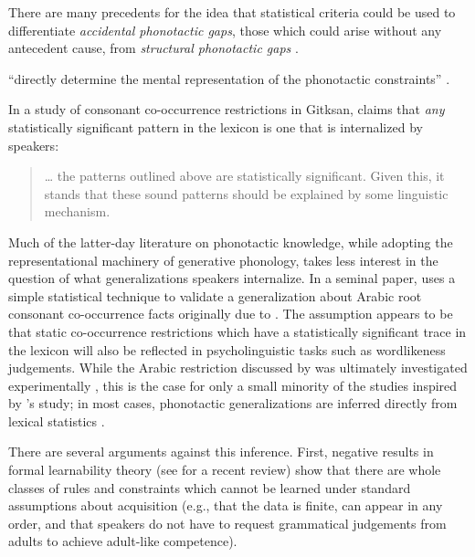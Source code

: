 \label{turkish}

There are many precedents for the idea that statistical criteria could be used to differentiate \emph{accidental phonotactic gaps}, those which could arise without any antecedent cause, from \emph{structural phonotactic gaps} \citep[e.g.,][]{Fischer-Jorgensen1952,Saporta1955,Saporta1958,Vogt1954}.

``directly determine the mental representation of the phonotactic constraints'' \citep[180]{Frisch2004}.

In a study of consonant co-occurrence restrictions in Gitksan, \citet{Brown2010} claims that \emph{any} statistically significant pattern in the lexicon is one that is internalized by speakers:

\begin{quote}
\ldots{} the patterns outlined above are statistically significant. Given this, it stands that these sound patterns should be explained by some linguistic mechanism. \citep[][48]{Brown2010}
\end{quote}

Much of the latter-day literature on phonotactic knowledge, while adopting the representational machinery of generative phonology, takes less interest in the question of what generalizations speakers internalize. In a seminal paper, \citet{McCarthy1988} uses a simple statistical technique to validate a generalization about Arabic root consonant co-occurrence facts originally due to \citet{Greenberg1950}. The assumption appears to be that static co-occurrence restrictions which have a statistically significant trace in the lexicon will also be reflected in psycholinguistic tasks such as wordlikeness judgements. While the Arabic restriction discussed by \citeauthor{McCarthy1988} was ultimately investigated experimentally \citep{Frisch2004}, this is the case for only a small minority of the studies inspired by \citeauthor{McCarthy1988}'s study; in most cases, phonotactic generalizations are inferred directly from lexical statistics \citep[e.g.,][]{Anttila2008a,Berkley1994b,Berkley1994a,Berkley2000,Brown2010,Buckley1997,Coetzee2008a,Elmedlaoui1995,GraffInPress,MacEachern1999,Kinney2005,Kawahara2006,Martin2007,Martin2011,Mester1988,Miller-Ockhuizen2003,Padgett1992,Padgett1995,Pozdniakov2007,Yip1989}. 

There are several arguments against this inference. First, negative results in formal learnability theory (see \citealt{Yang2012} for a recent review) show that there are whole classes of rules and constraints which cannot be learned under standard assumptions about acquisition (e.g., that the data is finite, can appear in any order, and that speakers do not have to request grammatical judgements from adults to achieve adult-like competence). 

